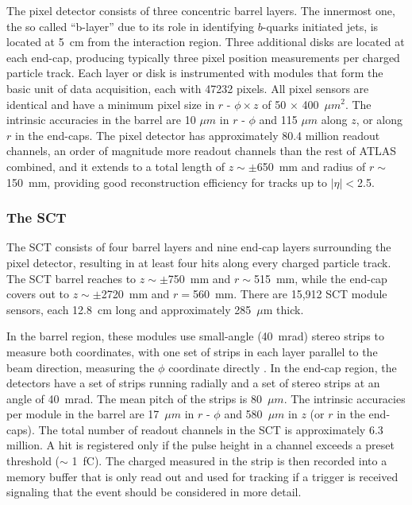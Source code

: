 The pixel detector consists of three concentric barrel layers. The innermost one, the so called ``b-layer'' due to its role in identifying $b$-quarks initiated jets, is located at 5~cm from the interaction region. Three additional disks are located at each end-cap, producing typically three pixel position measurements per charged particle track.  Each layer or disk is instrumented with modules that form the basic unit of data acquisition, each with 47232 pixels.  All pixel sensors are identical and have a minimum pixel size in $r$ - $\phi \times z$ of 50 $\times$ 400~$\mu m^2$. The intrinsic accuracies in the barrel are 10 $\mu m$ in $r$ - $\phi$ and 115 $\mu m$ along $z$, or along $r$ in the end-caps. The pixel detector has approximately 80.4 million readout channels, an order of magnitude more readout channels than the rest of ATLAS combined, and it extends to a total length of $z \sim \pm$650~mm and radius of $r \sim$150~mm, providing good reconstruction efficiency for tracks up to $|\eta| <$2.5.





 
\subsubsection{The SCT}


The SCT consists of four barrel layers and nine end-cap layers surrounding the pixel detector, resulting in at least four hits along every charged particle track.  The SCT barrel reaches to $z\sim \pm$750~mm and $r \sim $515~mm, while the end-cap covers out to $z\sim \pm$2720~mm and $r =$560~mm.  There are 15,912 SCT module sensors, each 12.8~cm long and approximately 285~$\mu $m thick. 

In the barrel region, these modules use small-angle (40~mrad) stereo strips to measure both coordinates, with one set of strips in each layer parallel to the beam direction, measuring the $\phi$ coordinate directly . In the end-cap region, the detectors have a set of strips running radially and a set of stereo strips at an angle of 40~mrad. The mean pitch of the strips is 80~$\mu m$. The intrinsic accuracies per module in the barrel are 17~$\mu m$ in $r$ - $\phi $ and 580~$\mu m$ in $z$ (or $r$ in the end-caps). The total number of readout channels in the SCT is approximately 6.3 million.  A hit is registered only if the pulse height in a channel exceeds a preset threshold ($\sim $ 1~fC). The charged measured in the strip is then recorded into a memory buffer that is only read out and used for tracking if a trigger is received signaling that the event should be considered in more detail.


